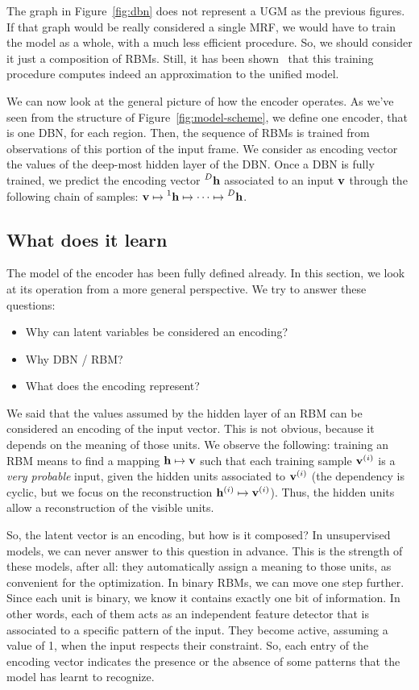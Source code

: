The graph in Figure~\ref{fig:dbn} does not represent a UGM as the previous
figures. If that graph would be really considered a single MRF, we would have
to train the model as a whole, with a much less efficient procedure. So, we
should consider it just a composition of RBMs. Still, it has been
shown~\cite{bib:dbn-learning} that this training procedure computes indeed
an approximation to the unified model.

We can now look at the general picture of how the encoder operates. As we've
seen from the structure of Figure~\vref{fig:model-scheme}, we define one
encoder, that is one DBN, for each region. Then, the sequence of RBMs is
trained from observations of this portion of the input frame. We consider as
encoding vector the values of the deep-most hidden layer of the DBN. Once a
DBN is fully trained, we predict the encoding vector $\prescript{D}{}{\mathbf{h}}$
associated to an input $\mathbf{v}$ through the following chain of samples: $\mathbf{v}
\mapsto \prescript{1}{}{\mathbf{h}} \mapsto \dots \mapsto \prescript{D}{}{\mathbf{h}}$.


\subsection{What does it learn}

\label{sec:encoding-what-learns}

The model of the encoder has been fully defined already. In this section, we
look at its operation from a more general perspective. We try to answer these
questions:
\begin{itemize}[nosep]
	\item Why can latent variables be considered an encoding?
	\item Why DBN / RBM?
	\item What does the encoding represent?
\end{itemize}
\bigskip

We said that the values assumed by the hidden layer of an RBM can be
considered an encoding of the input vector. This is not obvious, because it
depends on the meaning of those units. We observe the following: training an
RBM means to find a mapping $\mathbf{h} \mapsto \mathbf{v}$ such that each training sample
$\mathbf{v}^{(i)}$ is a \emph{very probable} input, given the hidden units
associated to $\mathbf{v}^{(i)}$ (the dependency is cyclic, but we focus on the
reconstruction $\mathbf{h}^{(i)} \mapsto \mathbf{v}^{(i)}$). Thus, the hidden units
allow a reconstruction of the visible units.

So, the latent vector is an encoding, but how is it composed? In unsupervised
models, we can never answer to this question in advance. This is the strength
of these models, after all: they automatically assign a meaning to those
units, as convenient for the optimization. In binary RBMs, we can move one
step further. Since each unit is binary, we know it contains exactly one bit
of information. In other words, each of them acts as an independent feature
detector that is associated to a specific pattern of the input. They become
active, assuming a value of 1, when the input respects their constraint. So,
each entry of the encoding vector indicates the presence or the absence of
some patterns that the model has learnt to recognize.

